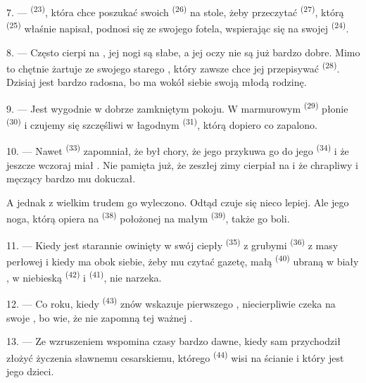 7. ---  \textsuperscript{(23)}, która chce poszukać swoich
 \textsuperscript{(26)} na stole, żeby przeczytać 
\textsuperscript{(27)}, którą  \textsuperscript{(25)} właśnie napisał,
podnosi się ze swojego fotela, wspierając się na swojej 
\textsuperscript{(24)}.

8. --- Często cierpi na , jej
nogi są słabe, a jej oczy nie są już bardzo dobre. Mimo to chętnie żartuje ze swojego
starego , który zawsze chce jej przepisywać 
\textsuperscript{(28)}. Dzisiaj jest bardzo radosna, bo ma wokół siebie swoją młodą
rodzinę.

9. --- Jest wygodnie w dobrze zamkniętym pokoju. W marmurowym 
\textsuperscript{(29)} płonie  \textsuperscript{(30)} i czujemy się
szczęśliwi w łagodnym   \textsuperscript{(31)}, którą
dopiero co zapalono.

\VUsaut{4.2mm}
\VUsaut{3.0mm}

10. --- Nawet  \textsuperscript{(33)} zapomniał, że był chory, że jego
 przykuwa go do jego  \textsuperscript{(34)} i że
jeszcze wczoraj miał . Nie pamięta już, że zeszłej zimy
cierpiał na  i że chrapliwy i męczący  bardzo mu
dokuczał.

A jednak z wielkim trudem go wyleczono. Odtąd czuje się nieco lepiej. Ale jego noga,
którą opiera na  \textsuperscript{(38)} położonej na małym
 \textsuperscript{(39)}, także go boli.

11. --- Kiedy jest starannie owinięty w swój ciepły 
\textsuperscript{(35)} z grubymi  \textsuperscript{(36)} z masy
perłowej i kiedy ma obok siebie, żeby mu czytać gazetę, małą 
\textsuperscript{(40)} ubraną w biały , w niebieską 
\textsuperscript{(42)} i  \textsuperscript{(41)}, nie narzeka.

12. --- Co roku, kiedy  \textsuperscript{(43)} znów wskazuje
 pierwszego , niecierpliwie czeka na swoje
, bo wie, że nie zapomną tej ważnej .

13. --- Ze wzruszeniem wspomina czasy bardzo dawne, kiedy sam przychodził złożyć
życzenia sławnemu  cesarskiemu, którego 
\textsuperscript{(44)} wisi na ścianie i który jest  jego dzieci.
\VUsaut{6.0mm}
\VUfilet{22mm}
